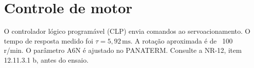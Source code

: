 \documentclass{article}
\begin{document}
\section{Controle de motor}
O controlador lógico programável (CLP) envia comandos ao servoacionamento.
O tempo de resposta medido foi $\tau = 5,92\,\mathrm{ms}$.
A rotação aproximada é de ~100 r/min.
O parâmetro A6N é ajustado no PANATERM.
Consulte a NR-12, item 12.11.3.1 b, antes do ensaio.
\end{document}
